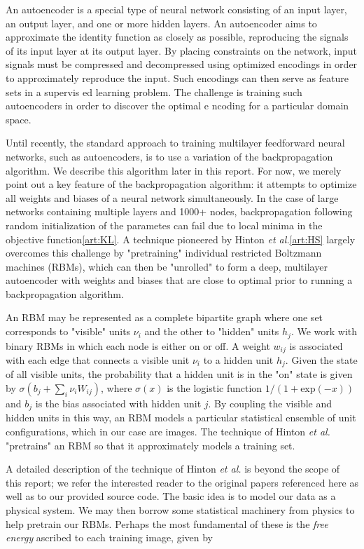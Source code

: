 \documentclass{article}
\begin{document}
An autoencoder is a special type of neural network consisting of an input layer, an output layer, and one or more hidden layers. An autoencoder aims to approximate the identity function as closely as possible, reproducing the signals of its input layer at its output layer. By placing constraints on the network, input signals must be compressed and decompressed using optimized encodings in order to approximately reproduce the input. Such encodings can then serve as feature sets in a supervis
ed learning problem. The challenge is training such autoencoders in order to discover the optimal e
ncoding for a particular domain space.

Until recently, the standard approach to training multilayer feedforward neural networks, such as autoencoders, is to use a variation of the backpropagation algorithm. We describe this algorithm later in this report. For now, we merely point out a key feature of the backpropagation algorithm: it attempts to optimize all weights and biases of a neural network simultaneously. In the case of large networks containing multiple layers and 1000+ nodes, backpropagation following random initialization of the parametes can fail due to local minima in the objective function\ref{art:KL}. A technique pioneered by Hinton {\em et al.}\ref{art:HS} largely overcomes this challenge by "pretraining" individual restricted Boltzmann machines (RBMs), which can then be "unrolled" to form a deep, multilayer autoencoder with weights and biases that are close to optimal prior to running a backpropagation algorithm.

An RBM may be represented as a complete bipartite graph where one set corresponds to "visible" units $\nu_i$ and the other to "hidden" units $h_j$. We work with binary RBMs in which each node is either on or off. A weight $w_{ij}$ is associated with each edge that connects a visible unit $\nu_i$ to a hidden unit $h_j$. Given the state of all visible units, the probability that a hidden unit is in the "on" state is given by $\sigma\left(b_j + \sum_i{\nu_iW_{ij}}\right)$, where $\sigma (x)$ is the logistic function $1/(1 + \mathrm{exp}(-x))$ and $b_j$ is the bias associated with hidden unit $j$. By coupling the visible and hidden units in this way, an RBM models a particular statistical ensemble of unit configurations, which in our case are images. The technique of Hinton {\em et al.} "pretrains" an RBM so that it approximately models a training set.

A detailed description of the technique of Hinton {\em et al.} is beyond the scope of this report; we refer the interested reader to the original papers referenced here as well as to our provided source code. The basic idea is to model our data as a physical system. We may then borrow some statistical machinery from physics to help pretrain our RBMs. Perhaps the most fundamental of these is the {\em free energy} ascribed to each training image, given by
\end{document}
